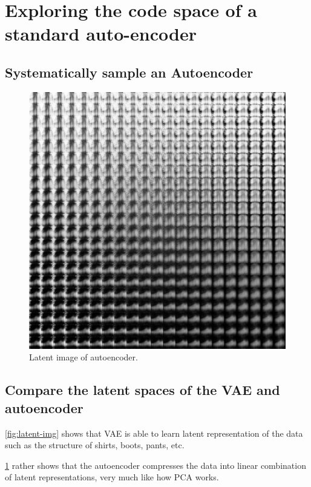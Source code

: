 \documentclass[twocolumn]{article}
\begin{document}
\section{Exploring the code space of a standard auto-encoder}

\subsection{Systematically sample an Autoencoder}

\begin{figure}
    \includegraphics[width=\linewidth]{Figures/latent_img_2.pdf}
    \caption{Latent image of autoencoder.}
    \label{fig:latent-img-2}
\end{figure}

\subsection{Compare the latent spaces of the VAE and autoencoder}

\cref{fig:latent-img} shows that VAE is able to learn latent representation of the data such as the structure of shirts, boots, pants, etc.

\cref{fig:latent-img-2} rather shows that the autoencoder compresses the data into linear combination of latent representations, very much like how PCA works.
\end{document}

